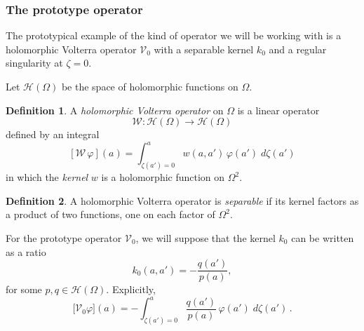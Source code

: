 \documentclass{article}
\theoremstyle{definition}
\newtheorem{definition}{Definition}
\theoremstyle{plain}
\newcommand{\holo}{\mathcal{H}}
\newcommand{\genvolterra}{\mathcal{W}}
\newcommand{\genker}{w}
\newcommand{\hardpart}{\mathcal{V}_0}
\newcommand{\hardker}{k_0}
\newcommand{\domain}{\Omega}
\newenvironment{revtwo}{\color{revred}}{\color{black}}
\newenvironment{revtwo}{}{}
\begin{document}
\subsubsection{The prototype operator}\label{setting:basic}
The prototypical example of the kind of operator we will be working with is a holomorphic Volterra operator $\hardpart$ with a separable kernel $\hardker$ and a regular singularity at $\zeta = 0$.

Let $\holo(\domain)$ be the space of holomorphic functions on $\domain$.
\begin{definition}\label{defn:volterra}
A {\em holomorphic Volterra operator} on $\domain$ is a linear operator
\[\genvolterra\colon\holo(\domain)\to\holo(\domain) \]
defined by an integral
\begin{revtwo}
\[ [\genvolterra\,\varphi](a) = \int_{\zeta(a') = 0}^a \genker(a, a')\,\varphi(a')\;d\zeta(a') \]
\end{revtwo}
in which the {\em kernel} $w$ is a holomorphic function on $\Omega^2$.
\end{definition}
\begin{definition}
A holomorphic Volterra operator is {\em separable} if its kernel factors as a product of two functions, one on each factor of $\Omega^2$.
\end{definition}
For the prototype operator $\hardpart$, we will suppose that the kernel $\hardker$ can be written as a ratio
\[ \hardker(a, a') = - \frac{q(a')}{p(a)}, \]
for some $p, q \in \mathcal{H}(\Omega)$. \begin{revtwo}Explicitly,
\[ \big[\hardpart \varphi\big](a) = - \int_{\zeta(a')=0}^{a} \frac{q(a')}{p(a)}\,\varphi(a')\;d\zeta(a')\,. \]
\end{revtwo}
\end{document}
